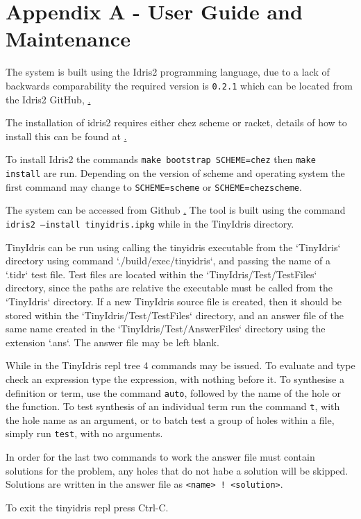 \documentclass[a4paper]{article}
\begin{document}
\nocite{*}
  
\clearpage

\section{Appendix A - User Guide and Maintenance}

The system is built using the Idris2 programming language, due to
a lack of backwards comparability the required version is
\texttt{0.2.1} which can be located from the Idris2 GitHub,
\href{https://github.com/idris-lang/Idris2/tree/compat-0.2.1}.

The installation of idris2 requires either chez scheme or racket,
details of how to install this can be found at
\href{https://www.scheme.com/}.

To install Idris2 the commands \texttt{make bootstrap SCHEME=chez}
then \texttt{make install} are run. Depending on the version of
scheme and operating system the first command may change to
\texttt{SCHEME=scheme} or \texttt{SCHEME=chezscheme}. 


The system can be accessed from Github \href{https://github.com/Ablach/tiny-idris-program-synthesis}. The tool is built using the command
\texttt{idris2 --install tinyidris.ipkg} while in the TinyIdris
directory. 

TinyIdris can be run using calling the tinyidris executable 
from the `TinyIdris` directory using command `./build/exec/tinyidris`, and passing
the name of a `.tidr` test file. 
Test files are located within the `TinyIdris/Test/TestFiles` directory, since the paths are 
relative the executable must be called from the `TinyIdris` directory.
If a new TinyIdris source file is created, then it
should be stored within the `TinyIdris/Test/TestFiles`
directory, and an answer file of the same name created in the
`TinyIdris/Test/AnswerFiles` directory using the extension `.ans`.
The answer file may be left blank. 

While in the TinyIdris repl tree 4 commands may be issued. To evaluate
and type check an expression type the expression, with nothing before
it. To synthesise a definition or term, use the command \texttt{auto},
followed by the name of the hole or the function.
To test synthesis of an individual term run the command \texttt{t},
with the hole name as an argument, or to batch test a group of holes
within a file, simply run \texttt{test}, with no arguments.

In order for the last two commands to work the answer file must contain
solutions for the problem, any holes that do not habe a solution will
be skipped. Solutions are written in the answer file as
\texttt{<name> ! <solution>}.

To exit the tinyidris repl press Ctrl-C.
\end{document}
